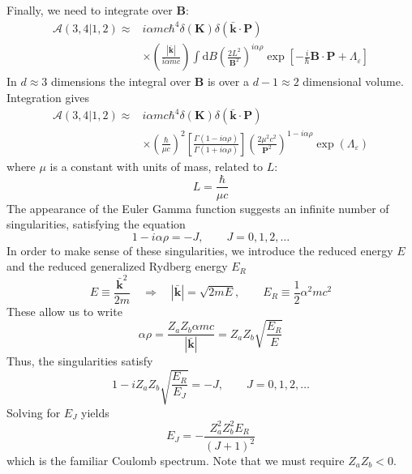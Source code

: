 Finally, we need to integrate over $\mathbf{B}$:
\begin{equation}
\begin{split}
	\mathcal{A}(3,4|1,2) \approx {}& i \alpha m c \hbar^{4} \delta(\mathbf{K}) \delta\left(\bar{\mathbf{k}} \cdot \mathbf{P} \right) \\
	&\times \left(\frac{|\bar{\mathbf{k}}|}{i \alpha m c} \right) \int \mathrm{d}B \left( \frac{2 L^{2}}{\mathbf{B}^{2}} \right)^{i \alpha \rho} \exp{\left[ -\frac{i}{\hbar} \mathbf{B} \cdot \mathbf{P} + \Lambda_{\varepsilon}\right]}
\end{split}
\end{equation}
In $d \approx 3$ dimensions the integral over $\mathbf{B}$ is over a $d - 1 \approx 2$ dimensional volume. Integration gives
\begin{equation}
\begin{split}
	\mathcal{A}(3,4|1,2) \approx {}& i \alpha m c \hbar^{4} \delta(\mathbf{K}) \delta\left(\bar{\mathbf{k}} \cdot \mathbf{P} \right) \\
	&\times \left( \frac{\hbar}{\mu c} \right)^{2} \left[ \frac{\Gamma(1 - i \alpha \rho)}{\Gamma(1 + i \alpha \rho)} \right] \left( \frac{2 \mu^{2}c^{2} }{\mathbf{P}^{2}} \right)^{1 - i \alpha \rho} \exp{(\Lambda_{\varepsilon})}
\end{split} \label{CouAmp}
\end{equation}
where $\mu$ is a constant with units of mass, related to $L$:
\begin{equation}
	L = \frac{\hbar}{\mu c}
\end{equation}
The appearance of the Euler Gamma function suggests an infinite number of singularities, satisfying the equation
\begin{equation}
	1 - i \alpha \rho = - J, \qquad J = 0, 1, 2, \ldots \label{NRSing}
\end{equation}
In order to make sense of these singularities, we introduce the reduced energy $E$ and the reduced generalized Rydberg energy $E_{R}$
\begin{equation}
	E \equiv \frac{\bar{\mathbf{k}}^{2}}{2 m} \quad \Longrightarrow \quad |\bar{\mathbf{k}}| = \sqrt{2 m E}, \qquad E_{R} \equiv \frac{1}{2} \alpha^{2} m c^{2}
\end{equation}
These allow us to write
\begin{equation}
	\alpha \rho = \frac{Z_{a} Z_{b} \alpha mc}{|\bar{\mathbf{k}}|} = Z_{a} Z_{b} \sqrt{\frac{E_{R}}{E}}
\end{equation}
Thus, the singularities satisfy
\begin{equation}
	1 - i Z_{a} Z_{b} \sqrt{\frac{E_{R}}{E_{J}}} = - J, \qquad J = 0, 1, 2, \ldots
\end{equation}
Solving for $E_{J}$ yields
\begin{equation}
	E_{J} = -\frac{Z_{a}^{2} Z_{b}^{2}E_{R}}{(J+1)^{2}}
\end{equation}
which is the familiar Coulomb spectrum. Note that we must require $Z_{a} Z_{b} < 0$.

